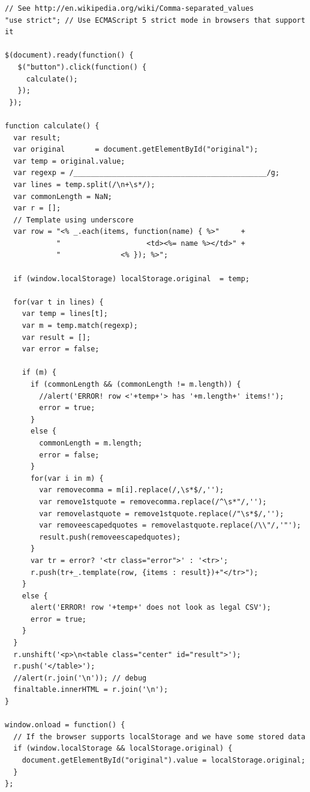 
\begin{verbatim}
// See http://en.wikipedia.org/wiki/Comma-separated_values
"use strict"; // Use ECMAScript 5 strict mode in browsers that support it

$(document).ready(function() {
   $("button").click(function() {
     calculate();
   });
 });

function calculate() {
  var result;
  var original       = document.getElementById("original");
  var temp = original.value;
  var regexp = /_____________________________________________/g;
  var lines = temp.split(/\n+\s*/);
  var commonLength = NaN;
  var r = [];
  // Template using underscore
  var row = "<% _.each(items, function(name) { %>"     +
            "                    <td><%= name %></td>" +
            "              <% }); %>";

  if (window.localStorage) localStorage.original  = temp;
  
  for(var t in lines) {
    var temp = lines[t];
    var m = temp.match(regexp);
    var result = [];
    var error = false;
    
    if (m) {
      if (commonLength && (commonLength != m.length)) {
        //alert('ERROR! row <'+temp+'> has '+m.length+' items!');
        error = true;
      }
      else {
        commonLength = m.length;
        error = false;
      }
      for(var i in m) {
        var removecomma = m[i].replace(/,\s*$/,'');
        var remove1stquote = removecomma.replace(/^\s*"/,'');
        var removelastquote = remove1stquote.replace(/"\s*$/,'');
        var removeescapedquotes = removelastquote.replace(/\\"/,'"');
        result.push(removeescapedquotes);
      }
      var tr = error? '<tr class="error">' : '<tr>';
      r.push(tr+_.template(row, {items : result})+"</tr>");
    }
    else {
      alert('ERROR! row '+temp+' does not look as legal CSV');
      error = true;
    }
  }
  r.unshift('<p>\n<table class="center" id="result">');
  r.push('</table>');
  //alert(r.join('\n')); // debug
  finaltable.innerHTML = r.join('\n');
}

window.onload = function() {
  // If the browser supports localStorage and we have some stored data
  if (window.localStorage && localStorage.original) {
    document.getElementById("original").value = localStorage.original;
  }
};
\end{verbatim}

